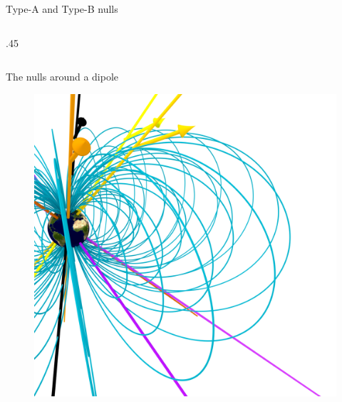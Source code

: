 \documentclass[final]{beamer}
\newlength{\onecolwid}
\newlength{\twocolwid}
\begin{document}
\begin{frame}[t]
\begin{columns}[t]
\begin{column}{\twocolwid}
\begin{columns}[t,totalwidth=\twocolwid]
\begin{column}{\onecolwid}
\begin{block}{Type-A and Type-B nulls}
\begin{columns}[t,totalwidth=\onecolwid]
\begin{column}{.45\onecolwid}
\begin{centering}
\begin{figure}
        \end{figure}
    \end{centering}
    \end{column}
\end{columns}

\end{block}


\end{column} %

\end{columns} %

\begin{block}{The nulls around a dipole}
    \begin{figure}
        \includegraphics[width=\twocolwid]{fig/mainfig.png}
    \end{figure}

\end{block}


\end{column}
\end{columns}
\end{frame}
\end{document}
